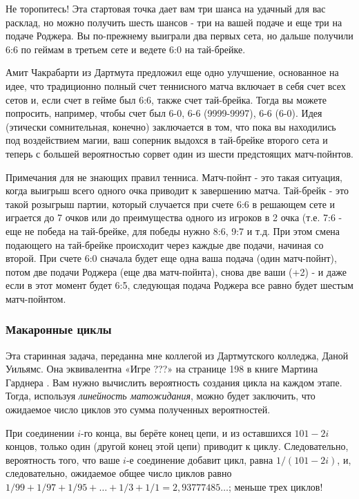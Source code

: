 Не торопитесь! Эта стартовая точка дает вам три шанса на удачный для
вас расклад, но можно
получить шесть шансов - три на вашей подаче и еще три на подаче Роджера.
Вы по-прежнему выиграли два первых сета, но дальше получили 6:6 по
геймам в третьем сете и ведете 6:0 на тай-брейке.

Амит Чакрабарти из Дартмута предложил еще одно улучшение, основанное
на идее, что традиционно полный счет теннисного матча
включает в себя счет всех сетов и, если счет в гейме был 6:6, также
счет тай-брейка.
Тогда вы можете попросить, например, чтобы счет был 6-0, 6-6
(9999-9997), 6-6 (6-0).
Идея (этически сомнительная, конечно) заключается в том, что пока вы
находились под воздействием магии,
ваш соперник выдохся в тай-брейке второго сета и теперь с большей
вероятностью сорвет один из
шести предстоящих матч-пойнтов.

\begin{addedbytheeditors}
Примечания для не знающих правил тенниса. Матч-пойнт - это такая
ситуация, когда выигрыш всего одного очка приводит
к завершению матча. Тай-брейк - это такой розыгрыш партии, который
случается при счете 6:6 в решающем сете и играется до 7 очков или до
преимущества
одного из игроков в 2 очка (т.е. 7:6 - еще не победа на тай-брейке,
для победы нужно 8:6, 9:7 и т.д. При этом смена подающего на
тай-брейке происходит через каждые две подачи, начиная со второй. При
счете 6:0 сначала будет еще одна ваша подача (один матч-пойнт), потом
две подачи Роджера (еще два матч-пойнта), снова две ваши (+2) - и даже
если в этот момент будет 6:5, следующая подача Роджера все равно будет
шестым матч-пойнтом.
\end{addedbytheeditors}

\subsubsection*{Макаронные циклы}

Эта старинная задача, переданна мне коллегой из Дартмутского колледжа, Даной Уильямс.
Она эквивалентна «Игре ???» на странице 198 в книге Мартина Гарднера \cite{gardner1971}.
Вам нужно вычислить вероятность создания цикла на каждом этапе.
Тогда, используя \emph{линейность матожидания}, можно будет заключить, что ожидаемое число циклов это сумма полученных вероятностей.

При соединении $i$-го конца, вы берёте конец цепи, и из оставшихся $101 - 2i$ концов, только один (другой конец этой цепи) приводит к циклу.
Следовательно, вероятность того, что ваше $i$-е соединение добавит цикл, равна $1/(101 - 2i)$, и, следовательно, ожидаемое общее число циклов равно $1/99 + 1/97 + 1/95 +\dots + 1/3 + 1/1 = 2{,}93777485\dots$; меньше трех циклов!

